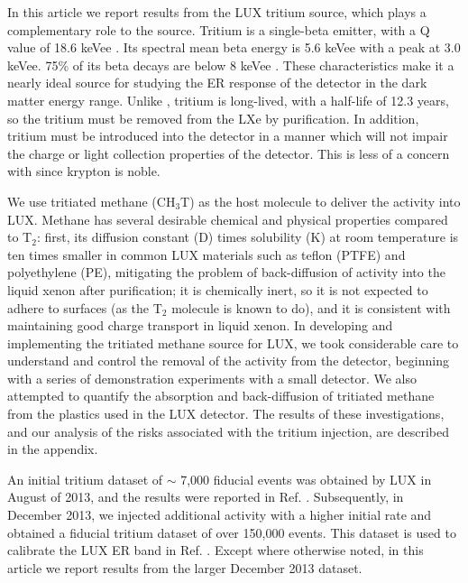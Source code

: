 In this article we report results from the LUX tritium source, which plays a complementary role to the \krsrc source. Tritium is a single-beta emitter, with a Q value of 18.6 keVee \cite{Tritium_Q}. Its spectral mean beta energy is 5.6 keVee \cite{Tritium_Mean} with a peak at 3.0 keVee. 75\% of its beta decays are below 8 keVee \cite{Tritium_Eq}. These characteristics make it a nearly ideal source for studying the ER response of the detector in the dark matter energy range. Unlike \krsrc, tritium is long-lived, with a half-life of 12.3 years\cite{Tritium_halflife_all}, so the tritium must be removed from the LXe by purification. In addition, tritium must be introduced into the detector in a manner which will not impair the charge or light collection properties of the detector. This is less of a concern with \krsrc since krypton is noble.

We use tritiated methane (CH$_3$T) as the host molecule to deliver the activity into LUX. Methane has several desirable chemical and physical properties compared to T$_2$: first, its diffusion constant (D) times solubility (K) at room temperature is ten times smaller in common LUX materials such as teflon (PTFE) and polyethylene (PE)\cite{miyake:1983}, mitigating the problem of back-diffusion of activity into the liquid xenon after purification; it is chemically inert, so it is not expected to adhere to surfaces (as the T$_2$ molecule is known to do), and it is consistent with maintaining good charge transport in liquid xenon. In developing and implementing the tritiated methane source for LUX, we took considerable care to understand and control the removal of the activity from the detector, beginning with a series of demonstration experiments with a small detector. We also attempted to quantify the absorption and back-diffusion of tritiated methane from the plastics used in the LUX detector. The results of these investigations, and our analysis of the risks associated with the tritium injection, are described in the appendix.

An initial tritium dataset of $\sim$ 7,000 fiducial events was obtained by LUX in August of 2013, and the results were reported in Ref. \cite{lux-results}. Subsequently, in December 2013, we injected additional activity with a higher initial rate and obtained a fiducial tritium dataset of over 150,000 events. This dataset is used to calibrate the LUX ER band in Ref. \cite{lux-reanalysis}. Except where otherwise noted, in this article we report results from the larger December 2013 dataset.